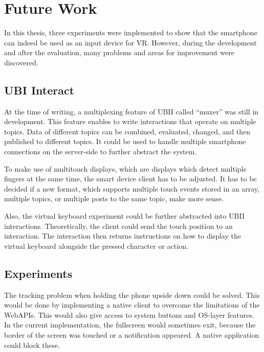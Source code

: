 \chapter{Future Work}\label{chapter:future-work}

In this thesis, three experiments were implemented to show that the smartphone can indeed be used as an input device for \ac{VR}. However, during the development and after the evaluation, many problems and areas for improvement were discovered. 


\section{UBI Interact}\label{section:fw-ubii}

At the time of writing, a multiplexing feature of \ac{UBII} called \enquote{muxer} was still in development. This feature enables to write interactions that operate on multiple topics. Data of different topics can be combined, evaluated, changed, and then published to different topics. It could be used to handle multiple smartphone connections on the server-side to further abstract the system.

To make use of multitouch displays, which are displays which detect multiple fingers at the same time, the smart device client has to be adjusted. It has to be decided if a new format, which supports multiple touch events stored in an array, multiple topics, or multiple posts to the same topic, make more sense.

Also, the virtual keyboard experiment could be further abstracted into \ac{UBII} interactions. Theoretically, the client could send the touch position to an interaction. The interaction then returns instructions on how to display the virtual keyboard alongside the pressed character or action.


\section{Experiments}\label{section:fw-experiments}

The tracking problem when holding the phone upside down could be solved. This would be done by implementing a native client to overcome the limitations of the WebAPIs. This would also give access to system buttons and \ac{OS}-layer features. In the current implementation, the fullscreen would sometimes exit, because the border of the screen was touched or a notification appeared. A native application could block these.

